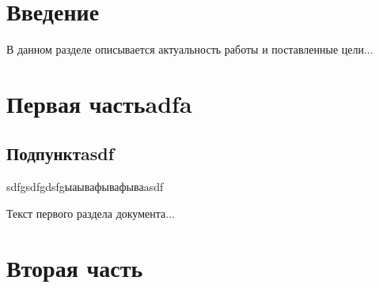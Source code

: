 \documentclass[paper=a4, fontsize=14pt, pagesize, DIV=calc, oneside]{scrreport}
\begin{document}
\pagestyle{empty} 



\newpage
\tableofcontents
\newpage

\pagestyle{plain}
\setcounter{page}{2} 



\chapter*{Введение}



В данном разделе описывается актуальность работы и поставленные цели...



\chapter{Первая частьadfa}




\section{Подпунктasdf}



sdfgsdfgdsfgыаывафывафываasdf


Текст первого раздела документа...



\chapter{Вторая часть}

\end{document}
